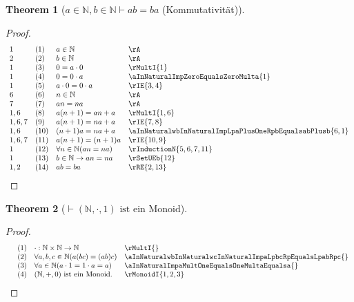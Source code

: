 \documentclass{book}
\theoremstyle{plain}
\newtheorem{theorem}{Theorem}
\theoremstyle{remark}
\theoremstyle{definition}
\begin{document}
\label{aInNaturalwbInNaturalImpabEqualsba}
\begin{theorem}[\(a\in\mathbb{N},b\in\mathbb{N}\vdash ab=ba\) (Kommutativität)]
\end{theorem}
\begin{proof}
        \[
	\begin{array}{llll}
            1       &  (1) & a\in\mathbb{N} & \rA \\
            2       &  (2) & b\in\mathbb{N} & \rA \\
            1       &  (3) & 0=a\cdot 0 & \rMultI{1} \\
            1       &  (4) & 0=0\cdot a & \aInNaturalImpZeroEqualsZeroMulta{1} \\
            1       &  (5) & a\cdot 0=0\cdot a & \rIE{3,4} \\
            6       &  (6) & n\in\mathbb{N} & \rA \\
            7       &  (7) & an=na & \rA \\
            1,6     &  (8) & a(n+1)=an+a & \rMultI{1,6} \\
            1,6,7   &  (9) & a(n+1)=na+a & \rIE{7,8} \\
            1,6     &  (10) & (n+1)a=na+a &  \aInNaturalwbInNaturalImpLpaPlusOneRpbEqualsabPlusb{6,1} \\
            1,6,7   &  (11) & a(n+1)=(n+1)a & \rIE{10,9} \\
            1       &  (12) & \forall n\in\mathbb{N}(an=na) & \rInductionN{5,6,7,11} \\
            1       &  (13) & b\in\mathbb{N}\rightarrow an=na & \rSetUEb{12} \\
            1,2     &  (14) & ab=ba & \rRE{2,13} \\
    \end{array}
	\]
\end{proof}

\label{ImpLpNaturalwMultwOneRpInMonoid}
\begin{theorem}[\(\vdash (\mathbb{N},\cdot,1) \text{ ist ein Monoid}\)]
\end{theorem}
\begin{proof}
        \[
	\begin{array}{llll}
                &  (1) & \cdot:\mathbb{N}\times\mathbb{N}\rightarrow\mathbb{N} & \rMultI{} \\
                &  (2) & \forall a,b,c\in\mathbb{N}(a(bc)=(ab)c) & \aInNaturalwbInNaturalwcInNaturalImpaLpbcRpEqualsLpabRpc{} \\
                &  (3) & \forall a\in\mathbb{N}(a\cdot 1=1\cdot a=a) & \aInNaturalImpaMultOneEqualsOneMultaEqualsa{} \\
                &  (4) & (\mathbb{N},+,0) \text{ ist ein Monoid.} & \rMonoidI{1,2,3} \\
	\end{array}
	\]
\end{proof}
\end{document}
